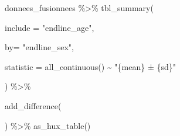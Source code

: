 \documentclass[
  14pt,
]{article}
\newenvironment{Shaded}{\begin{snugshade}}{\end{snugshade}}
\newcommand{\AttributeTok}[1]{\textcolor[rgb]{0.77,0.63,0.00}{#1}}
\newcommand{\CommentTok}[1]{\textcolor[rgb]{0.56,0.35,0.01}{\textit{#1}}}
\newcommand{\DecValTok}[1]{\textcolor[rgb]{0.00,0.00,0.81}{#1}}
\newcommand{\FunctionTok}[1]{\textcolor[rgb]{0.00,0.00,0.00}{#1}}
\newcommand{\NormalTok}[1]{#1}
\newcommand{\OtherTok}[1]{\textcolor[rgb]{0.56,0.35,0.01}{#1}}
\newcommand{\SpecialCharTok}[1]{\textcolor[rgb]{0.00,0.00,0.00}{#1}}
\newcommand{\StringTok}[1]{\textcolor[rgb]{0.31,0.60,0.02}{#1}}
\begin{document}
\begin{Shaded}
\end{Shaded}

\begin{Shaded}
\begin{Highlighting}[]
\NormalTok{donnees\_fusionnees }\SpecialCharTok{\%\textgreater{}\%}   \FunctionTok{tbl\_summary}\NormalTok{(}
  
  \AttributeTok{include =} \StringTok{"endline\_age"}\NormalTok{,}
  
  \AttributeTok{by=} \StringTok{"endline\_sex"}\NormalTok{,}
  
  \AttributeTok{statistic =} \FunctionTok{all\_continuous}\NormalTok{() }\SpecialCharTok{\textasciitilde{}} \StringTok{"\{mean\} ± \{sd\}"}
  
\NormalTok{) }\SpecialCharTok{\%\textgreater{}\%}
  
  \FunctionTok{add\_difference}\NormalTok{(}
    
\NormalTok{  ) }\SpecialCharTok{\%\textgreater{}\%} 
  \FunctionTok{as\_hux\_table}\NormalTok{()}
\end{Highlighting}
\end{Shaded}

 
  \providecommand{\huxb}[2]{\arrayrulecolor[RGB]{#1}\global\arrayrulewidth=#2pt}
  \providecommand{\huxvb}[2]{\color[RGB]{#1}\vrule width #2pt}
  \providecommand{\huxtpad}[1]{\rule{0pt}{#1}}
  \providecommand{\huxbpad}[1]{\rule[-#1]{0pt}{#1}}
\end{document}

